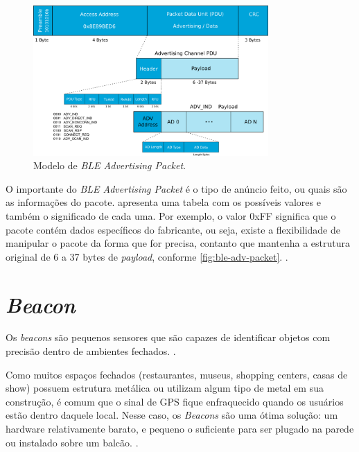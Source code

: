 \begin{figure}[htb]
	\caption{\label{fig:ble-adv-packet}Modelo de \textit{BLE Advertising Packet}.}
	\begin{center}
		\includegraphics[width=0.8\textwidth]{img/ble-adv-packet.png}
	\end{center}
\end{figure}

O importante do \textit{BLE Advertising Packet} é o tipo de anúncio feito, ou quais são as informações do pacote.  apresenta uma tabela com os possíveis valores e também o significado de cada uma. Por exemplo, o valor 0xFF significa que o pacote contém dados específicos do fabricante, ou seja, existe a flexibilidade de manipular o pacote da forma que for precisa, contanto que mantenha a estrutura original de 6 a 37 bytes de \textit{payload}, conforme \autoref{fig:ble-adv-packet}. \cite{ble-packets}.

\section{\textit{Beacon}}\label{sec:beacon}

Os \textit{beacons} são pequenos sensores que são capazes de identificar objetos com precisão dentro de ambientes fechados. \cite{teixeira-beacon}.

\begin{citacao}
Como muitos espaços fechados (restaurantes, museus, shopping centers, casas de show) possuem estrutura metálica ou utilizam algum tipo de metal em sua construção, é comum que o sinal de GPS fique enfraquecido quando os usuários estão dentro daquele local. Nesse caso, os \textit{Beacons} são uma ótima solução: um hardware relativamente barato, e pequeno o suficiente para ser plugado na parede ou instalado sobre um balcão. \cite{teixeira-beacon}.
\end{citacao}

